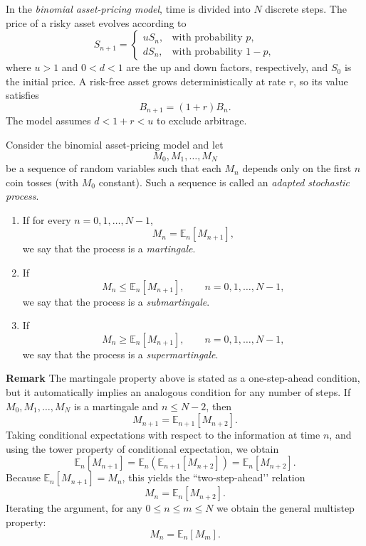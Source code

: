 \begin{definition} 
In the \emph{binomial asset-pricing model}, time is divided into $N$ discrete steps.  
The price of a risky asset evolves according to
\[
S_{n+1} = 
\begin{cases}
u S_n, & \text{with probability } p,\\[4pt]
d S_n, & \text{with probability } 1-p,
\end{cases}
\]
where $u>1$ and $0<d<1$ are the up and down factors, respectively, and $S_0$ is the initial price.  
A risk-free asset grows deterministically at rate $r$, so its value satisfies
\[
B_{n+1} = (1+r) B_n.
\]
The model assumes $d < 1+r < u$ to exclude arbitrage.
\end{definition}

\begin{definition}
    Consider the binomial asset-pricing model and let
\[
M_0, M_1, \ldots, M_N
\]
be a sequence of random variables such that each $M_n$ depends only on the first $n$ coin tosses (with $M_0$ constant).  
Such a sequence is called an \emph{adapted stochastic process}.
\begin{enumerate}
    \item If for every $n = 0, 1, \ldots, N-1$,
    \[
    M_n = \mathbb{E}_n[M_{n+1}],
    \]
    we say that the process is a \emph{martingale}.

    \item If
    \[
    M_n \le \mathbb{E}_n[M_{n+1}], \qquad n = 0,1,\ldots,N-1,
    \]
    we say that the process is a \emph{submartingale}.

    \item If
    \[
    M_n \ge \mathbb{E}_n[M_{n+1}], \qquad n = 0,1,\ldots,N-1,
    \]
    we say that the process is a \emph{supermartingale}.
\end{enumerate}
\end{definition}

\textbf{Remark}  
The martingale property above is stated as a one-step-ahead condition,  
but it automatically implies an analogous condition for any number of steps.  
If $M_0, M_1, \ldots, M_N$ is a martingale and $n \le N-2$, then
\[
M_{n+1} = \mathbb{E}_{n+1}[M_{n+2}].
\]
Taking conditional expectations with respect to the information at time $n$, and using the tower property of conditional expectation, we obtain
\[
\mathbb{E}_n[M_{n+1}]
= \mathbb{E}_n\!\left( \mathbb{E}_{n+1}[M_{n+2}] \right)
= \mathbb{E}_n[M_{n+2}].
\]
Because $\mathbb{E}_n[M_{n+1}] = M_n$, this yields the “two-step-ahead’’ relation
\[
M_n = \mathbb{E}_n[M_{n+2}].
\]
Iterating the argument, for any $0 \le n \le m \le N$ we obtain the general multistep property:
\[
M_n = \mathbb{E}_n[M_m].
\]

